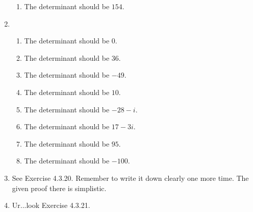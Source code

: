 \begin{enumerate}
\begin{enumerate}
\item The determinant should be $154$.
\end{enumerate}
\item \begin{enumerate}
\item The determinant should be $0$.
\item The determinant should be $36$.
\item The determinant should be $-49$.
\item The determinant should be $10$.
\item The determinant should be $-28-i$.
\item The determinant should be $17-3i$.
\item The determinant should be $95$.
\item The determinant should be $-100$.
\end{enumerate}
\item See Exercise 4.3.20. Remember to write it down clearly one more time. The given proof there is simplistic.
\item Ur...look Exercise 4.3.21.
\end{enumerate}